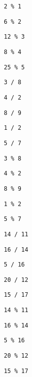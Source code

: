 \begin{exercise}
\begin{sltasks}
\begin{items}
        \item \texttt{2 \% 1}
        \item \texttt{6 \% 2}
        \item \texttt{12 \% 3}
        \item \texttt{8 \% 4}
        \item \texttt{25 \% 5}
    \end{items}
    \task
    \begin{items}
        \item \texttt{3 / 8}
        \item \texttt{4 / 2}
        \item \texttt{8 / 9}
        \item \texttt{1 / 2}
        \item \texttt{5 / 7}
    \end{items}
    \task
    \begin{items}
        \item \texttt{3 \% 8}
        \item \texttt{4 \% 2}
        \item \texttt{8 \% 9}
        \item \texttt{1 \% 2}
        \item \texttt{5 \% 7}
    \end{items}
    \task
    \begin{items}
        \item \texttt{14 / 11}
        \item \texttt{16 / 14}
        \item \texttt{5 / 16}
        \item \texttt{20 / 12}
        \item \texttt{15 / 17}
    \end{items}
    \task
    \begin{items}
        \item \texttt{14 \% 11}
        \item \texttt{16 \% 14}
        \item \texttt{5 \% 16}
        \item \texttt{20 \% 12}
        \item \texttt{15 \% 17}
    \end{items}
\end{sltasks}
\end{exercise}


